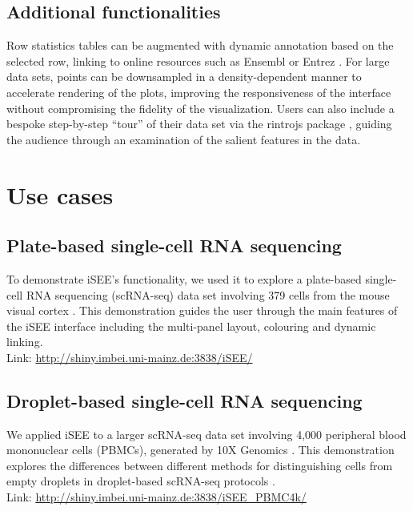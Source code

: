 \documentclass[10pt,a4paper,twocolumn]{article}
\let\cite\citep
\begin{document}
\subsection*{Additional functionalities}
Row statistics tables can be augmented with dynamic annotation based on the selected row, linking to online resources such as Ensembl \citep{zerbino2018ensembl} or Entrez \citep{ncbi2017entrez}. %
For large data sets, points can be downsampled in a density-dependent manner to accelerate rendering of the plots, improving the responsiveness of the interface without compromising the fidelity of the visualization.
Users can also include a bespoke step-by-step ``tour'' of their data set via the rintrojs package \cite{ganz2016rintrojs}, guiding the audience through an examination of the salient features in the data.

\section*{Use cases} %

\subsection*{Plate-based single-cell RNA sequencing}
To demonstrate iSEE's functionality, we used it to explore a plate-based single-cell RNA sequencing (scRNA-seq) data set involving 379 cells from the mouse visual cortex \citep{tasic2016allen}.
This demonstration guides the user through the main features of the iSEE interface including the multi-panel layout, colouring and dynamic linking.\\

Link: \url{http://shiny.imbei.uni-mainz.de:3838/iSEE/}

\subsection*{Droplet-based single-cell RNA sequencing}
We applied iSEE to a larger scRNA-seq data set involving 4,000 peripheral blood mononuclear cells (PBMCs), generated by 10X Genomics \citep{zheng2017massively}.
This demonstration explores the differences between different methods for distinguishing cells from empty droplets in droplet-based scRNA-seq protocols \citep{lun2018distinguishing}.\\

Link: \url{http://shiny.imbei.uni-mainz.de:3838/iSEE_PBMC4k/}
\end{document}
